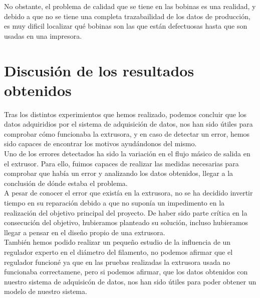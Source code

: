 No obstante, el problema de calidad que se tiene en las bobinas es una realidad, y debido a que no se tiene una completa trazabailidad de los datos de producción, es muy dificil localizar qué bobinas son las que están defectuosas hasta que son usadas en una impresora.

\section{Discusión de los resultados obtenidos}

Tras los distintos experimientos que hemos realizado, podemos concluir que los datos adquiridios por el sistema de adquisición de datos, nos han sido útiles para comprobar cómo funcionaba la extrusora, y en caso de detectar un error, hemos sido capaces de encontrar los motivos ayudándonos del mismo.\\

Uno de los errores detectados ha sido la variación en el flujo másico de salida en el extrusor. Para ello, fuimos capaces de realizar las medidas necesarias para comprobar que había un error y analizando los datos obtenidos, llegar a la conclusión de dónde estaba el problema.\\

A pesar de conocer el error que existía en la extrusora, no se ha decidido invertir tiempo en su reparación debido a que no suponía un impedimento en la realización del objetivo principal del proyecto. De haber sido parte crítica en la consecución del objetivo, hubieramos planteado su solución, incluso hubieramos llegar a pensar en el diseño propio de una extrusora.\\

También hemos podido realizar un pequeño estudio de la influencia de un regulador experto en el diámetro del filamento, no podemos afirmar que el regulador funcioné ya que en las pruebas realizadas la extrusora usada no funcionaba correctamene, pero si podemos afirmar, que los datos obtenidos con nuestro sistema de adquisicón de datos, nos han sido útiles para poder obtener un modelo de nuestro sistema.\\